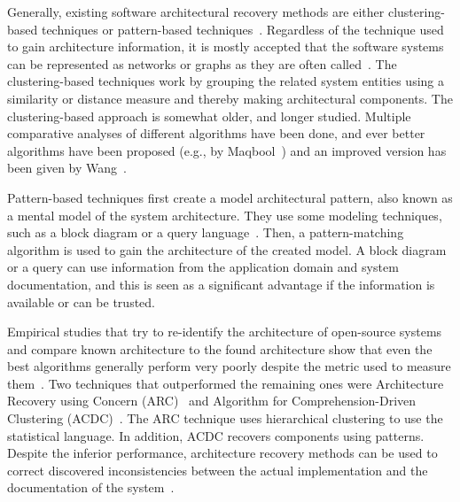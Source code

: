\documentclass[english, 12pt, a4paper, sci, utf8, a-2b, online, obeyspaces]{aaltothesis}
\begin{document}
Generally, existing software architectural recovery methods are either clustering-based techniques or pattern-based techniques~\cite{sartipi2003software}. Regardless of the technique used to gain architecture information, it is mostly accepted that the software systems can be represented as networks or graphs as they are often called~\cite{sartipi2003software}. The clustering-based techniques work by grouping the related system entities using a similarity or distance measure and thereby making architectural components. The clustering-based approach is somewhat older, and longer studied. Multiple comparative analyses of different algorithms have been done, and ever better algorithms have been proposed (e.g., by Maqbool~\cite{maqbool2007hierarchical}) and an improved version has been given by Wang~\cite{wang2010improved}.

Pattern-based techniques first create a model architectural pattern, also known as a mental model of the system architecture. They use some modeling techniques, such as a block diagram or a query language~\cite{sartipi2003software}. Then, a pattern-matching algorithm is used to gain the architecture of the created model. A block diagram or a query can use information from the application domain and system documentation, and this is seen as a significant advantage if the information is available or can be trusted. 

Empirical studies that try to re-identify the architecture of open-source systems and compare known architecture to the found architecture show that even the best algorithms generally perform very poorly despite the metric used to measure them~\cite{garcia2013comparative}. Two techniques that outperformed the remaining ones were Architecture Recovery using Concern (ARC)~\cite{garcia2011enhancing} and Algorithm for Comprehension-Driven Clustering (ACDC)~\cite{tzerpos2000acdc}. The ARC technique uses hierarchical clustering to use the statistical language. In addition, ACDC recovers components using patterns. Despite the inferior performance, architecture recovery methods can be used to correct discovered inconsistencies between the actual implementation and the documentation of the system~\cite{lutellier2015comparing}.
\end{document}
